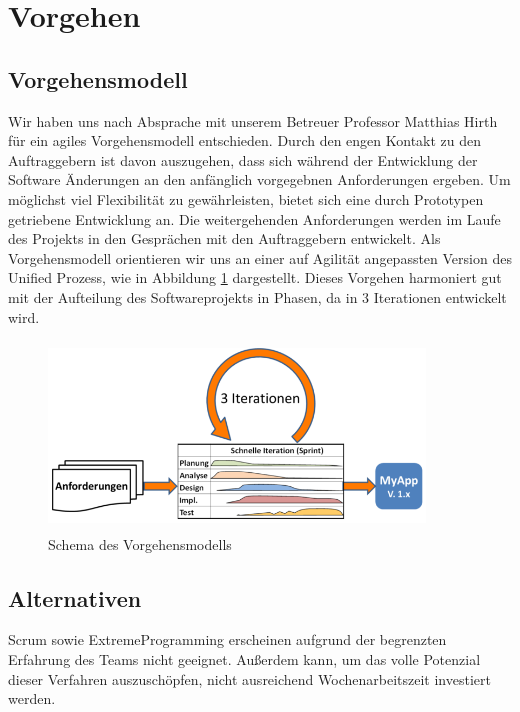 \section{Vorgehen}
\subsection{Vorgehensmodell}
Wir haben uns nach Absprache mit unserem Betreuer Professor Matthias Hirth für ein agiles Vorgehensmodell entschieden. Durch den engen Kontakt zu den Auftraggebern ist davon auszugehen, dass sich während der Entwicklung der Software Änderungen an den anfänglich vorgegebnen Anforderungen ergeben. Um möglichst viel Flexibilität zu gewährleisten, bietet sich eine durch Prototypen getriebene Entwicklung an. Die weitergehenden Anforderungen werden im Laufe des Projekts in den Gesprächen mit den Auftraggebern entwickelt. Als Vorgehensmodell orientieren wir uns an einer auf Agilität angepassten Version des Unified Prozess, wie in Abbildung \ref{fig:UPAgil} dargestellt. Dieses Vorgehen harmoniert gut mit der Aufteilung des Softwareprojekts in Phasen, da in 3 Iterationen entwickelt wird.

\begin{figure}[htp]
    \centering
    \includegraphics[width=10cm , height=5cm]{Kapitel/Bilder/AgileUnifiedProcess.png}
    \caption[Schema des Vorgehensmodells]{Schema des Vorgehensmodells\protect\footnotemark}
    \label{fig:UPAgil}
\end{figure}

\newpage

\subsection{Alternativen}
\noindent Scrum sowie ExtremeProgramming erscheinen aufgrund der begrenzten Erfahrung des Teams nicht geeignet. Außerdem kann, um das volle Potenzial dieser Verfahren auszuschöpfen, nicht ausreichend Wochenarbeitszeit investiert werden.

